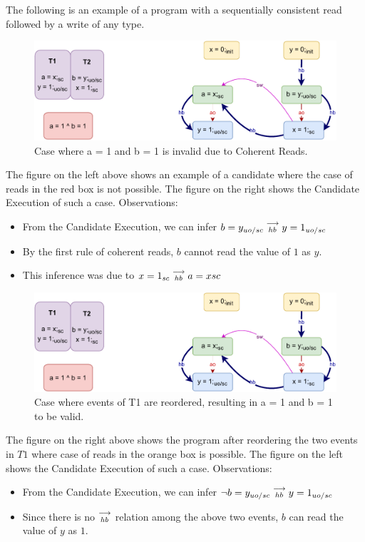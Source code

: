         The following is an example of a program with a sequentially consistent read followed by a write of any type. 
        \begin{figure}[H]
            \centering
            \includegraphics[scale=0.7]{InstructionReordering/Example3(Rsc-Wuo,sc).pdf}
            \caption{Case where a = 1 and b = 1 is invalid due to Coherent Reads.}
        \end{figure}
        The figure on the left above shows an example of a candidate where the case of reads in the red box is not possible. 
        The figure on the right shows the Candidate Execution of such a case. 
        Observations:
        \begin{itemize}
            \item From the Candidate Execution, we can infer $b=y_{uo/sc}\stackrel{\longrightarrow}{_{hb}}y=1_{uo/sc}$
            \item By the first rule of coherent reads, $b$ cannot read the value of $1$ as $y$. 
            \item This inference was due to $x=1_{sc}\stackrel{\longrightarrow}{_{hb}}a=x{sc}$
        \end{itemize}

        \begin{figure}[H]
            \centering
            \includegraphics[scale=0.7]{InstructionReordering/Example3(Rsc-Wuo,sc).pdf}
            \caption{Case where events of T1 are reordered, resulting in  a = 1 and b = 1 to be valid.}
        \end{figure}
        The figure on the right above shows the program after reordering the two events in $T1$ where case of reads in the orange box is possible. 
        The figure on the left shows the Candidate Execution of such a case. 
        Observations:
        \begin{itemize}
            \item From the Candidate Execution, we can infer $\neg b=y_{uo/sc}\stackrel{\longrightarrow}{_{hb}}y=1_{uo/sc}$
            \item Since there is no $\stackrel{\longrightarrow}{_{hb}}$ relation among the above two events, $b$ can read the value of $y$ as $1$.
        \end{itemize}

